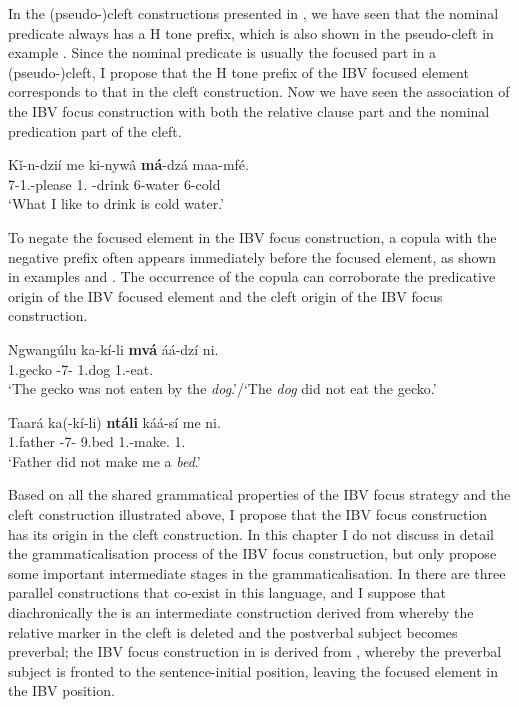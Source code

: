\documentclass[output=paper,colorlinks,citecolor=brown,
]{langscibook}
\begin{document}
In the (pseudo-)cleft constructions presented in , we have seen that the nominal predicate always has a H tone prefix, which is also shown in the pseudo-cleft in example . Since the nominal predicate is usually the focused part in a (pseudo-)cleft, I propose that the H tone prefix of the IBV focused element corresponds to that in the cleft construction. Now we have seen the association of the IBV focus construction with both the relative clause part and the nominal predication part of the cleft.
\begin{exe}
\ex
\label{156}
\gll
Kǐ-n-dzií me ki-nywâ \textbf{má}-dzá maa-mfé.\\
7\Rel{}-1\Sg{}.\Sm{}-please 1\Sg{}.\Pro{} \Inf{}-drink 6-water 6-cold\\
\trans ‘What I like to drink is cold water.’

\end{exe}
To negate the focused element in the IBV focus construction, a copula with the negative prefix often appears immediately before the focused element, as shown in examples  and . The occurrence of the copula can corroborate the predicative origin of the IBV focused element and the cleft origin of the IBV focus construction.
\begin{exe}
\ex
\label{157}
\gll
Ngwangúlu ka-kí-li \textbf{mvá} áá-dzí ni.\\
1.gecko \Neg{}-7\Sm{}-\Cop{} 1.dog 1\Sm{}.\Pst{}-eat.\Pst{} \Neg{}\\
\trans ‘The gecko was not eaten by the \textit{dog}.’/`The \textit{dog} did not eat the gecko.'

\end{exe}
\begin{exe}
\ex
\label{158}
\gll
Taará ka(-kí-li) \textbf{ntáli} káá-sí me ni.\\
1.father \Neg{}-7\Sm{}-\Cop{} 9.bed 1\Sm{}.\Pst{}-make.\Pst{} 1\Sg{}.\Pro{} \Neg{}\\
\trans ‘Father did not make me a \textit{bed}.’

\end{exe}
Based on all the shared grammatical properties of the IBV focus strategy and the cleft construction illustrated above, I propose that the IBV focus construction has its origin in the cleft construction. In this chapter I do not discuss in detail the grammaticalisation process of the IBV focus construction, but only propose some important intermediate stages in the grammaticalisation. In  there are three parallel constructions that co-exist in this language, and I suppose that diachronically the  is an intermediate construction derived from  whereby the relative marker in the cleft is deleted and the postverbal subject becomes preverbal; the IBV focus construction in  is derived from , whereby the preverbal subject is fronted to the sentence-initial position, leaving the focused element in the IBV position.
\end{document}
